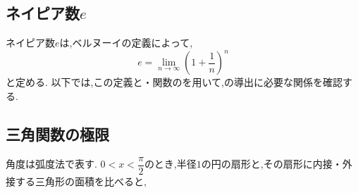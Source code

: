   \subsection{\texorpdfstring{ネイピア数$e$}{ネイピア数e}}\label{節：ネイピア数eの定義}
    ネイピア数$e$は,ベルヌーイの定義によって,
    \[
      e=\lim_{n\to\infty}\left(1+\frac{1}{n}\right)^n
    \]
    と定める.
    以下では,この定義と・関数のを用いて,の導出に必要な関係を確認する.

  \subsection{三角関数の極限}\label{節：三角関数の基本極限}
    角度は弧度法で表す.
    $0<x<\dfrac{\pi}{2}$のとき,半径$1$の円の扇形と,その扇形に内接・外接する三角形の面積を比べると,

